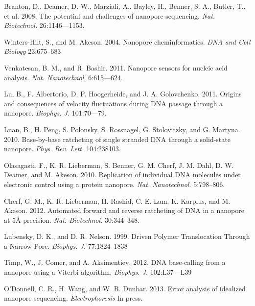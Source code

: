 \documentclass{biophys_letter}
\begin{document}
\begin{thebibliography}{99}

  Branton, D., Deamer, D. W., Marziali, A., Bayley, H., Benner, S. A., Butler, T., et al.
  2008.
  The potential and challenges of nanopore sequencing.
  {\it Nat. Biotechnol.}
  26:1146---1153.

  Winters-Hilt, S., and M. Akeson.
  2004.
  Nanopore cheminformatics.
  {\it DNA and Cell Biology}
  23:675--683

  Venkatesan, B. M., and R. Bashir.
  2011.
  Nanopore sensors for nucleic acid analysis.
  {\it Nat. Nanotechnol.}
  6:615---624.

  Lu, B., F. Albertorio, D. P. Hoogerheide, and J. A. Golovchenko.
  2011.
  Origins and consequences of velocity fluctuations during DNA passage through a nanopore.
  {\it Biophys. J.}
  101:70---79.

  Luan, B., H. Peng, S. Polonsky, S. Rossnagel, G. Stolovitzky, and G. Martyna.
  2010.
  Base-by-base ratcheting of single stranded DNA through a solid-state nanopore.
  {\it Phys. Rev. Lett.}
  104:238103.

  Olasagasti, F., K. R. Lieberman, S. Benner, G. M. Cherf, J. M. Dahl, D. W. Deamer, and M. Akeson.
  2010.
  Replication of individual DNA molecules under electronic control using a protein nanopore.
  {\it Nat. Nanotechnol.}
  5:798--806.

  Cherf, G. M., K. R. Lieberman, H. Rashid, C. E. Lam, K. Karplus, and M. Akeson.
  2012.
  Automated forward and reverse ratcheting of DNA in a nanopore at 5{\AA} precision.
  {\it Nat. Biotechnol.}
  30:344--348.

  Lubensky, D. K., and D. R. Nelson.
  1999.
  Driven Polymer Translocation Through a Narrow Pore.
  {\it Biophys. J.}
  77:1824--1838

  Timp, W., J. Comer, and A. Aksimentiev.
  2012.
  DNA base-calling from a nanopore using a Viterbi algorithm.
  {\it Biophys. J.}
  102:L37---L39


  O'Donnell, C. R., H. Wang, and W. B. Dunbar.
  2013.
  Error analysis of idealized nanopore sequencing.
  {\it Electrophoresis}
  In press.


\end{thebibliography}
\end{document}
